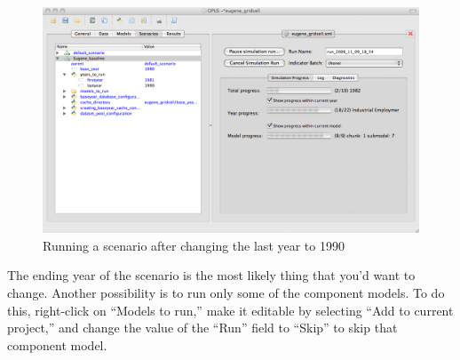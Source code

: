 \begin{figure}[htp]
\begin{center}
\includegraphics[scale=0.4]{part-gui/images/scenario-manager-change-lastyear.png}
\end{center}
\caption{Running a scenario after changing the last year to 1990}
\label{fig:scenario-manager-change-lastyear}
\end{figure}

The ending year of the scenario is the most likely thing that you'd want to
change.  Another possibility is to run only some of the component models.
To do this, right-click on ``Models to run,'' make it editable by
selecting ``Add to current project,'' and change the value of the ``Run''
field to ``Skip'' to skip that component model.
